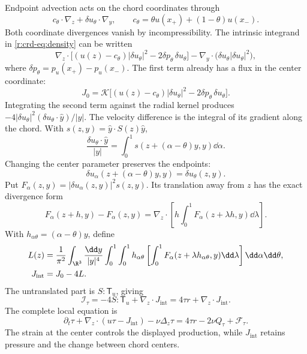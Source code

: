 Endpoint advection acts on the chord coordinates through
\[
 c_\theta\cdot\nabla_z+\delta u_\theta\cdot\nabla_y,\qquad
 c_\theta=\theta u(x_+)+(1-\theta)u(x_-).
\]
Both coordinate divergences vanish by incompressibility. The intrinsic
integrand in \eqref{r:crd-eq:density} can be written
\[
 \nabla_z\cdot\bigl[(u(z)-c_\theta)|\delta u_\theta|^2
               -2\delta p_\theta\,\delta u_\theta\bigr]
 -\nabla_y\cdot\bigl(\delta u_\theta|\delta u_\theta|^2\bigr),
\]
where \(\delta p_\theta=p_u(x_+)-p_u(x_-)\).
The first term already has a flux in the center coordinate:
\begin{equation}
 J_0=\mathcal K\bigl[(u(z)-c_\theta)|\delta u_\theta|^2
               -2\delta p_\theta\,\delta u_\theta\bigr].
 \label{r:crd-eq:first-flux}
\end{equation}
Integrating the second term against the radial kernel produces
\(-4|\delta u_\theta|^2(\delta u_\theta\cdot\widehat y)/|y|\).
The velocity difference is the integral of its gradient along the chord.
With \(s(z,y)=\widehat y\cdot S(z)\widehat y\),
\[
 \frac{\delta u_\theta\cdot\widehat y}{|y|}
 =\int_0^1s(z+(\alpha-\theta)y,y)\dd\alpha.
\]
Changing the center parameter preserves the endpoints:
\[
 \delta u_\alpha(z+(\alpha-\theta)y,y)
 =\delta u_\theta(z,y).
\]
Put \(F_\alpha(z,y)=|\delta u_\alpha(z,y)|^2s(z,y)\).
Its translation away from \(z\) has the exact divergence form
\[
 F_\alpha(z+h,y)-F_\alpha(z,y)
 =\nabla_z\cdot
 \left[h\int_0^1F_\alpha(z+\lambda h,y)\dd\lambda\right].
\]
With \(h_{\alpha\theta}=(\alpha-\theta)y\), define
\begin{equation}
 \begin{aligned}
 L(z)={}&\frac1{\pi^2}\int_{\R^3}\frac{\dd y}{|y|^4}
 \int_0^1\int_0^1 h_{\alpha\theta}
 \left[\int_0^1F_\alpha(z+\lambda h_{\alpha\theta},y)
                         \dd\lambda\right]\dd\alpha\dd\theta,\\
 J_{\mathrm{int}}={}&J_0-4L.
 \end{aligned}
 \label{r:crd-eq:full-flux}
\end{equation}
The untranslated part is \(S:\mathsf T_u\), giving
\begin{equation}
 \mathcal I_\tau=-4S:\mathsf T_u+\nabla_z\cdot J_{\mathrm{int}}
 =4\tau r+\nabla_z\cdot J_{\mathrm{int}}.
 \label{r:crd-eq:intrinsic-split}
\end{equation}
The complete local equation is
\begin{equation}
 \partial_t\tau+\nabla_z\cdot(u\tau-J_{\mathrm{int}})
 -\nu\Delta_z\tau
 =4\tau r-2\nu Q_\tau+\mathcal F_\tau.
 \label{r:crd-eq:local-conservation}
\end{equation}
The strain at the center controls the displayed production, while
\(J_{\mathrm{int}}\) retains pressure and the change between chord centers.

